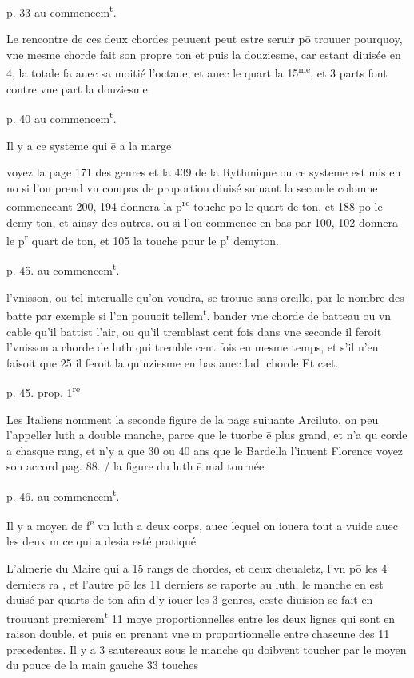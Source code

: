 \documentclass[11pt,a4paper]{article}
\begin{document}
p. 33 au commencem\textsuperscript{t}.

Le rencontre de ces deux chordes peuuent peut estre seruir pō trouuer pourquoy, vne mesme chorde fait son propre ton et puis la douziesme, car estant diuisée en 4, la totale fa\ill{} auec sa moitié l'octaue, et auec le quart la 15\textsuperscript{me}, et 3 parts font contre vne part la douziesme

p. 40 au commencem\textsuperscript{t}.

Il y a ce systeme qui ē a la marge

voyez la page 171 des genres et la 439 de la Rythmique ou ce systeme est mis en no\ill{} si l'on prend vn compas de proportion diuisé suiuant la seconde colomne commenceant \ill{} 200, 194 donnera la p\textsuperscript{re} touche pō le quart de ton, et 188 pō le demy ton, et ainsy des autres. ou si l'on commence en bas par 100, 102 donnera le p\textsuperscript{r} quart de ton, et 105 la touche pour le p\textsuperscript{r} demyton.

p. 45. au commencem\textsuperscript{t}.

l'vnisson, ou tel interualle qu'on voudra, se trouue sans oreille, par le nombre des batte\ill{} par exemple si l'on pouuoit tellem\textsuperscript{t}. bander vne chorde de batteau ou vn cable qu'il battist l'air, ou qu'il tremblast cent fois dans vne seconde il feroit l'vnisson a\ill{} chorde de luth qui tremble cent fois en mesme temps, et s'il n'en faisoit que 25 il feroit la quinziesme en bas auec lad. chorde Et cæt.


p. 45. prop. 1\textsuperscript{re}

Les Italiens nomment la seconde figure de la page suiuante Arciluto, on peu l'appeller luth a double manche, parce que le tuorbe ē plus grand, et n'a qu\ill{} corde a chasque rang, et n'y a que 30 ou 40 ans que le Bardella l'inuent\ill{} Florence voyez son accord pag. 88. / la figure du luth ē mal tournée

p. 46. au commencem\textsuperscript{t}.

Il y a moyen de f\textsuperscript{e} vn luth a deux corps, auec lequel on iouera tout a vuide auec les deux m\ill{} ce qui a desia esté pratiqué

L'almerie du Maire qui a 15 rangs de chordes, et deux cheualetz, l'vn pō les 4 derniers ra\ill{} , et l'autre pō les 11 derniers se raporte au luth, le manche en est diuisé par quarts de ton afin d'y iouer les 3 genres, ceste diuision se fait en trouuant premierem\textsuperscript{t} 11 moye\ill{} proportionnelles entre les deux lignes qui sont en raison double, et puis en prenant vne m\ill{} proportionnelle entre chascune des 11 precedentes. Il y a 3 sautereaux sous le manche qu\ill{} doibvent toucher par le moyen du pouce de la main gauche 33 touches
\end{document}
